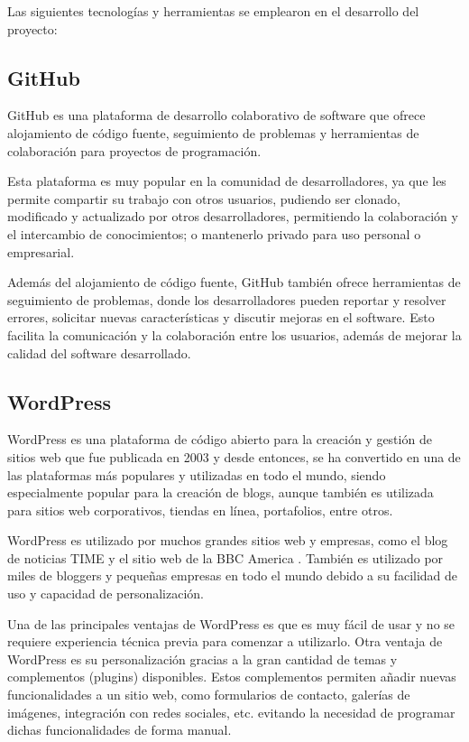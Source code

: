        Las siguientes tecnologías y herramientas se emplearon en el desarrollo del proyecto:
        
        \subsection{GitHub}
        
            GitHub es una plataforma de desarrollo colaborativo de software que ofrece alojamiento de código fuente, seguimiento de problemas y herramientas de colaboración para proyectos de programación.
            
            Esta plataforma es muy popular en la comunidad de desarrolladores, ya que les permite compartir su trabajo con otros usuarios, pudiendo ser clonado, modificado y actualizado por otros desarrolladores, permitiendo la colaboración y el intercambio de conocimientos; o mantenerlo privado para uso personal o empresarial.
            
            Además del alojamiento de código fuente, GitHub también ofrece herramientas de seguimiento de problemas, donde los desarrolladores pueden reportar y resolver errores, solicitar nuevas características y discutir mejoras en el software. Esto facilita la comunicación y la colaboración entre los usuarios, además de mejorar la calidad del software desarrollado.
            
            
        \subsection{WordPress}
            
            WordPress \cite{wordpress} es una plataforma de código abierto para la creación y gestión de sitios web que fue publicada en 2003 y desde entonces, se ha convertido en una de las plataformas más populares y utilizadas en todo el mundo, siendo especialmente popular para la creación de blogs, aunque también es utilizada para sitios web corporativos, tiendas en línea, portafolios, entre otros. 
            
            WordPress es utilizado por muchos grandes sitios web y empresas, como el blog de noticias TIME \cite{time-web} y el sitio web de la BBC America \cite{bbc-america-web}. También es utilizado por miles de bloggers y pequeñas empresas en todo el mundo debido a su facilidad de uso y capacidad de personalización.

            Una de las principales ventajas de WordPress es que es muy fácil de usar y no se requiere experiencia técnica previa para comenzar a utilizarlo. Otra ventaja de WordPress es su personalización gracias a la gran cantidad de temas y complementos (plugins) disponibles. Estos complementos permiten añadir nuevas funcionalidades a un sitio web, como formularios de contacto, galerías de imágenes, integración con redes sociales, etc. evitando la necesidad de programar dichas funcionalidades de forma manual.
            
